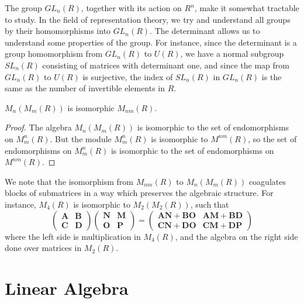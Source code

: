 The group $GL_n(R)$, together with its action on $R^n$, make it somewhat tractable to study. In the field of representation theory, we try and understand all groups by their homomorphisms into $GL_n(R)$. The determinant allows us to understand some properties of the group. For instance, since the determinant is a group homomorphism from $GL_n(R)$ to $U(R)$, we have a normal subgroup $SL_n(R)$ consisting of matrices with determinant one, and since the map from $GL_n(R)$ to $U(R)$ is surjective, the index of $SL_n(R)$ in $GL_n(R)$ is the same as the number of invertible elements in $R$.

\begin{theorem}
    $M_n(M_m(R))$ is isomorphic $M_{nm}(R)$.
\end{theorem}
\begin{proof}
    The algebra $M_n(M_m(R))$ is isomorphic to the set of endomorphisms on $M^n_m(R)$. But the module $M^n_m(R)$ is isomorphic to $M^{nm}(R)$, so the set of endomorphisms on $M^n_m(R)$ is isomorphic to the set of endomorphisms on $M^{nm}(R)$.
\end{proof}

We note that the isomorphism from $M_{nm}(R)$ to $M_n(M_m(R))$ coagulates blocks of submatrices in a way which preserves the algebraic structure. For instance, $M_{4}(R)$ is isomorphic to $M_2(M_2(R))$, such that
%
\[ \begin{pmatrix} \mathbf{A} & \mathbf{B} \\ \mathbf{C} & \mathbf{D} \end{pmatrix} \begin{pmatrix} \mathbf{N} & \mathbf{M} \\ \mathbf{O} & \mathbf{P} \end{pmatrix} = \begin{pmatrix} \mathbf{A} \mathbf{N} + \mathbf{B} \mathbf{O} & \mathbf{A} \mathbf{M} + \mathbf{B} \mathbf{D} \\ \mathbf{C} \mathbf{N} + \mathbf{D} \mathbf{O} & \mathbf{C} \mathbf{M} + \mathbf{D} \mathbf{P} \end{pmatrix} \]
%
where the left side is multiplication in $M_4(R)$, and the algebra on the right side done over matrices in $M_2(R)$.

\chapter{Linear Algebra}


